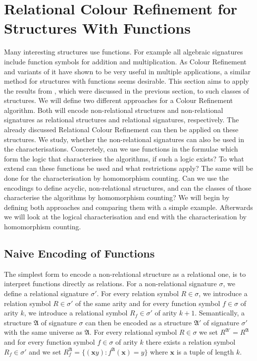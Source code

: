 \section{Relational Colour Refinement for Structures With Functions}
\label{sec:RelationalColourRefinemetForStructuresWithFunctions}

Many interesting structures use functions.
For example all algebraic signatures include function symbols for addition and multiplication.
As Colour Refinement and variants of it have shown to be very useful in multiple applications, a similar method for structures with functions seems desirable.
This section aims to apply the results from \cite{scheidt2025ColorRefinement}, which were discussed in the previous section, to such classes of structures.
We will define two different approaches for a Colour Refinement algorithm.
Both will encode non-relational structures and non-relational signatures as relational structures and relational signatures, respectively.
The already discussed Relational Colour Refinement can then be applied on these structures.
We study, whether the non-relational signatures can also be used in the characterisations.
Concretely, can we use functions in the formulae which form the logic that characterises the algorithms, if such a logic exists?
To what extend can these functions be used and what restrictions apply?
The same will be done for the characterisation by homomorphism counting.
Can we use the encodings to define acyclic, non-relational structures, and can the classes of those characterise the algorithms by homomorphism counting?
We will begin by defining both approaches and comparing them with a simple example.
Afterwards we will look at the logical characterisation and end with the characterisation by homomorphism counting.


\subsection{Naive Encoding of Functions}
\label{sec::NaiveEncodingOfFunctions}

The simplest form to encode a non-relational structure as a relational one, is to interpret functions directly as relations.
For a non-relational signature $\sigma$, we define a relational signature $\sigma'$.
For every relation symbol $R\in \sigma$, we introduce a relation symbol $R\in \sigma'$ of the same arity and for every function symbol $f\in\sigma$ of arity $k$, we introduce a relational symbol $R_f\in\sigma'$ of arity $k+1$.
Semantically, a structure $\mathfrak A$ of signature $\sigma$ can then be encoded as a structure $\mathfrak A'$ of signature $\sigma'$ with the same universe as $\mathfrak A$. 
For every relational symbol $R\in\sigma$ we set $R^{\mathfrak A'}= R^{\mathfrak A}$ and for every function symbol $f\in\sigma$ of arity $k$ there exists a relation symbol $R_f\in\sigma'$ and we set $R_f^{\mathfrak A}= \{(\mathbf xy) : f^{\mathfrak A}(\mathbf x)=y\}$ where $\mathbf x$ is a tuple of length $k$.

